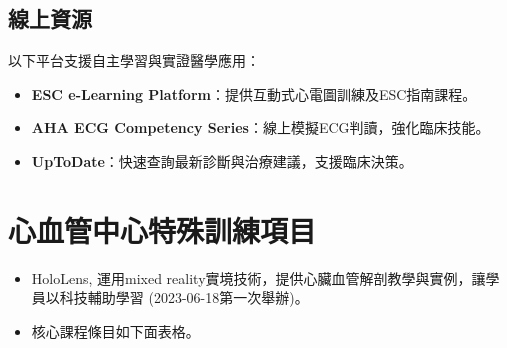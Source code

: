 \documentclass[12pt,a4paper]{article}
\begin{document}
\subsection{線上資源}
以下平台支援自主學習與實證醫學應用：
\begin{itemize}[nosep]
    \item \textbf{ESC e-Learning Platform}：提供互動式心電圖訓練及ESC指南課程。
    \item \textbf{AHA ECG Competency Series}：線上模擬ECG判讀，強化臨床技能。
    \item \textbf{UpToDate}：快速查詢最新診斷與治療建議，支援臨床決策。
\end{itemize}



\section{心血管中心特殊訓練項目}
\begin{itemize}
    \item HoloLens, 運用mixed reality實境技術，提供心臟血管解剖教學與實例，讓學員以科技輔助學習 (2023-06-18第一次舉辦)。
    \item 核心課程條目如下面表格。
\end{itemize}
\end{document}
